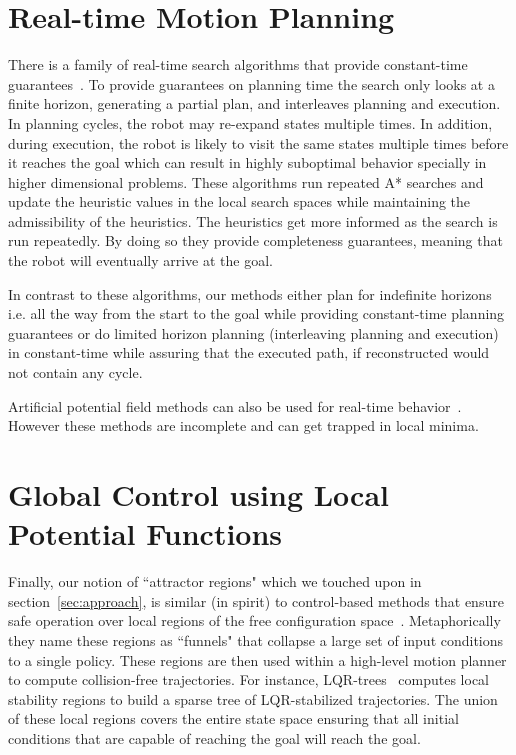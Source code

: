 \documentclass[a4paper]{report}
\begin{document}
\section{Real-time Motion Planning}
\label{rel:real}
There is a family of real-time search algorithms that provide constant-time guarantees~\cite{KL06,KS09,K90,bjornsson2009tba}.
	To provide guarantees on planning time the search only looks at a finite horizon, generating a partial plan, and interleaves planning and execution. In planning cycles, the robot may re-expand states multiple times. In addition, during execution, the robot is likely to visit the same states multiple times before it reaches the goal which can result in highly suboptimal behavior specially in higher dimensional problems. These algorithms run repeated A* searches and update the heuristic values in the local search spaces while maintaining the admissibility of the heuristics. The heuristics get more informed as the search is run repeatedly. By doing so they provide completeness guarantees, meaning that the robot will eventually arrive at the goal.

In contrast to these algorithms, our methods either plan for indefinite horizons i.e. all the way from the start to the goal while providing constant-time planning guarantees or do limited horizon planning (interleaving planning and execution) in constant-time while assuring that the executed path, if reconstructed would not contain any cycle.

Artificial potential field methods can also be used for real-time behavior~\cite{warren1989global,vadakkepat2000evolutionary}. However these methods are incomplete and can get trapped in local minima.

\section{Global Control using Local Potential Functions}
Finally, our notion of ``attractor regions" which we touched upon in section~\ref{sec:approach}, is similar (in spirit) to control-based methods that  ensure safe operation over local regions of the free configuration space~\cite{CRC03,CCR06,tedrake2010lqr}. Metaphorically they name these regions as ``funnels" that collapse a large set of input conditions to a single policy.
These regions are then used within a high-level motion planner to compute collision-free trajectories. For instance, LQR-trees~\cite{tedrake2010lqr} computes local stability regions to build a sparse tree of LQR-stabilized trajectories. The union of these local regions covers the entire state space ensuring that all initial conditions that are capable of reaching the goal will reach the goal.
\end{document}
